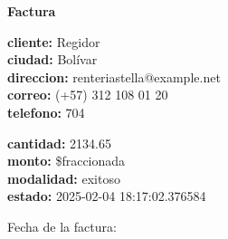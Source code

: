 \documentclass{article}
\begin{document}
\begin{center}
    {\LARGE \textbf{Factura}}\\[1cm]
\end{center}

\textbf{cliente:} Regidor \\
\textbf{ciudad:} Bolívar \\
\textbf{direccion:} renteriastella@example.net \\
\textbf{correo:} (+57) 312 108 01 20 \\
\textbf{telefono:} 704 \\

\vspace{0.5cm}

\textbf{cantidad:} 2134.65 \\
\textbf{monto:} \$fraccionada \\
\textbf{modalidad:} exitoso \\
\textbf{estado:} 2025-02-04 18:17:02.376584 \\

\vspace{1cm}

Fecha de la factura: 
\end{document}
